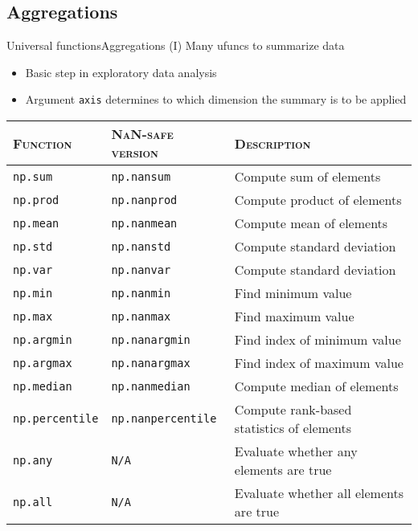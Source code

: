 \documentclass[10pt,compress]{beamer} %
\begin{document}
\subsection{Aggregations}
\begin{frame}{Universal functions}{Aggregations (I)}
	Many ufuncs to summarize data
	\begin{itemize}
		\item Basic step in exploratory data analysis
		\item Argument \texttt{axis} determines to which dimension the summary is to be applied
	\end{itemize}

	\smallskip

	\footnotesize{
    \begin{tabular}{lll}\hline
       \textsc{Function} & \textsc{NaN-safe version} & \textsc{Description}\\ \hline
	   \texttt{np.sum} & \texttt{np.nansum} & Compute sum of elements \\
	   \texttt{np.prod} & \texttt{np.nanprod} & Compute product of elements \\
	   \texttt{np.mean} & \texttt{np.nanmean} & Compute mean of elements \\
	   \texttt{np.std} & \texttt{np.nanstd} & Compute standard deviation \\
	   \texttt{np.var} & \texttt{np.nanvar} & Compute standard deviation \\
	   \texttt{np.min} & \texttt{np.nanmin} & Find minimum value \\
	   \texttt{np.max} & \texttt{np.nanmax} & Find maximum value \\
	   \texttt{np.argmin} & \texttt{np.nanargmin} & Find index of minimum value \\
	   \texttt{np.argmax} & \texttt{np.nanargmax} & Find index of maximum value \\
	   \texttt{np.median} & \texttt{np.nanmedian} & Compute median of elements \\
	   \texttt{np.percentile} & \texttt{np.nanpercentile} & Compute rank-based statistics of elements \\
	   \texttt{np.any} & \texttt{N/A} & Evaluate whether any elements are true \\
	   \texttt{np.all} & \texttt{N/A} & Evaluate whether all elements are true \\\hline
    \end{tabular}
	}
\end{frame}
\end{document}
